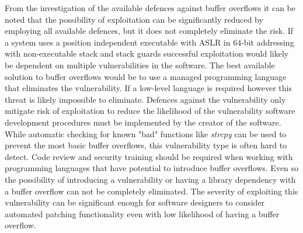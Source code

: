 From the investigation of the available defences against buffer overflows it can be noted that the possibility of exploitation can be significantly reduced by employing all available defences, but it does not completely eliminate the risk. If a system uses a position independent executable with ASLR in 64-bit addressing with non-executable stack and stack guards successful exploitation would likely be dependent on multiple vulnerabilities in the software. The best available solution to buffer overflows would be to use a managed programming language that eliminates the vulnerability. If a low-level language is required however this threat is likely impossible to eliminate. Defences against the vulnerability only mitigate risk of exploitation to reduce the likelihood of the vulnerability software development procedures must be implemented by the creator of the software. While automatic checking for known "bad" functions like \emph{strcpy} can be used to prevent the most basic buffer overflows, this vulnerability type is often hard to detect. Code review and security training should be required when working with programming languages that have potential to introduce buffer overflows. Even so the possibility of introducing a vulnerability or having a library dependency with a buffer overflow can not be completely eliminated. The severity of exploiting this vulnerability can be significant enough for software designers to consider automated patching functionality even with low likelihood of having a buffer overflow.

